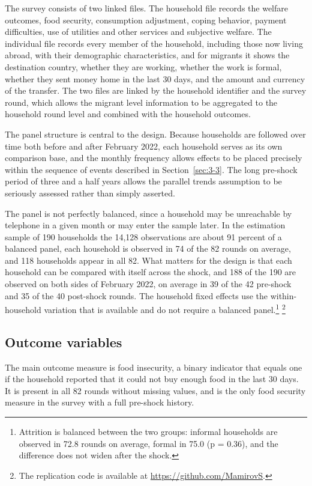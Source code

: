 The survey consists of two linked files. The household file records the welfare outcomes, food security, consumption adjustment, coping behavior, payment difficulties, use of utilities and other services and subjective welfare. The individual file records every member of the household, including those now living abroad, with their demographic characteristics, and for migrants it shows the destination country, whether they are working, whether the work is formal, whether they sent money home in the last 30 days, and the amount and currency of the transfer. The two files are linked by the household identifier and the survey round, which allows the migrant level information to be aggregated to the household round level and combined with the household outcomes.

The panel structure is central to the design. Because households are followed over time both before and after February 2022, each household serves as its own comparison base, and the monthly frequency allows effects to be placed precisely within the sequence of events described in Section~\ref{sec:3-3}. The long pre-shock period of three and a half years allows the parallel trends assumption to be seriously assessed rather than simply asserted.

The panel is not perfectly balanced, since a household may be unreachable by telephone in a given month or may enter the sample later. In the estimation sample of 190 households the 14,128 observations are about 91 percent of a balanced panel, each household is observed in 74 of the 82 rounds on average, and 118 households appear in all 82. What matters for the design is that each household can be compared with itself across the shock, and 188 of the 190 are observed on both sides of February 2022, on average in 39 of the 42 pre-shock and 35 of the 40 post-shock rounds. The household fixed effects use the within-household variation that is available and do not require a balanced panel.\footnote{Attrition is balanced between the two groups: informal households are observed in 72.8 rounds on average, formal in 75.0 (p = 0.36), and the difference does not widen after the shock.} 
\footnote{The replication code is available at
\url{https://github.com/MamirovS}.}
\subsection{Outcome variables}\label{sec:5-2}

The main outcome measure is food insecurity, a binary indicator that equals one if the household reported that it could not buy enough food in the last 30 days. It is present in all 82 rounds without missing values, and is the only food security measure in the survey with a full pre-shock history.

